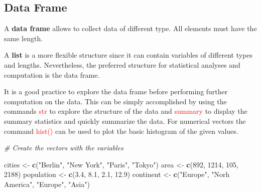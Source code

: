 \documentclass[
]{book}
\newenvironment{Shaded}{\begin{snugshade}}{\end{snugshade}}
\newcommand{\CommentTok}[1]{\textcolor[rgb]{0.56,0.35,0.01}{\textit{#1}}}
\newcommand{\DecValTok}[1]{\textcolor[rgb]{0.00,0.00,0.81}{#1}}
\newcommand{\FloatTok}[1]{\textcolor[rgb]{0.00,0.00,0.81}{#1}}
\newcommand{\FunctionTok}[1]{\textcolor[rgb]{0.13,0.29,0.53}{\textbf{#1}}}
\newcommand{\NormalTok}[1]{#1}
\newcommand{\OtherTok}[1]{\textcolor[rgb]{0.56,0.35,0.01}{#1}}
\newcommand{\StringTok}[1]{\textcolor[rgb]{0.31,0.60,0.02}{#1}}
\theoremstyle{definition}
\theoremstyle{definition}
\theoremstyle{definition}
\theoremstyle{definition}
\theoremstyle{remark}
\begin{document}
\hypertarget{data-frame}{%
\subsection{Data Frame}\label{data-frame}}

A \textbf{data frame} allows to collect data of different type.
All elements must have the same length.

A \textbf{list} is a more flexible structure since it can contain variables of different types and lengths.
Nevertheless, the preferred structure for statistical analyses and computation is the data frame.

It is a good practice to explore the data frame before performing further computation on the data.
This can be simply accomplished by using the commands \textcolor{red}{str} to explore the structure of the data and \textcolor{red}{summary} to display the summary statistics and quickly summarize the data.
For numerical vectors the command \textcolor{red}{hist()} can be used to plot the basic histogram of the given values.

\begin{Shaded}
\begin{Highlighting}[]
\CommentTok{\# Create the vectors with the variables}

\NormalTok{cities }\OtherTok{\textless{}{-}} \FunctionTok{c}\NormalTok{(}\StringTok{"Berlin"}\NormalTok{, }\StringTok{"New York"}\NormalTok{, }\StringTok{"Paris"}\NormalTok{, }\StringTok{"Tokyo"}\NormalTok{)}
\NormalTok{area }\OtherTok{\textless{}{-}} \FunctionTok{c}\NormalTok{(}\DecValTok{892}\NormalTok{, }\DecValTok{1214}\NormalTok{, }\DecValTok{105}\NormalTok{, }\DecValTok{2188}\NormalTok{)}
\NormalTok{population }\OtherTok{\textless{}{-}} \FunctionTok{c}\NormalTok{(}\FloatTok{3.4}\NormalTok{, }\FloatTok{8.1}\NormalTok{, }\FloatTok{2.1}\NormalTok{, }\FloatTok{12.9}\NormalTok{)}
\NormalTok{continent }\OtherTok{\textless{}{-}} \FunctionTok{c}\NormalTok{(}\StringTok{"Europe"}\NormalTok{, }\StringTok{"Norh America"}\NormalTok{, }\StringTok{"Europe"}\NormalTok{, }\StringTok{"Asia"}\NormalTok{)}
\end{Highlighting}
\end{Shaded}
\end{document}
